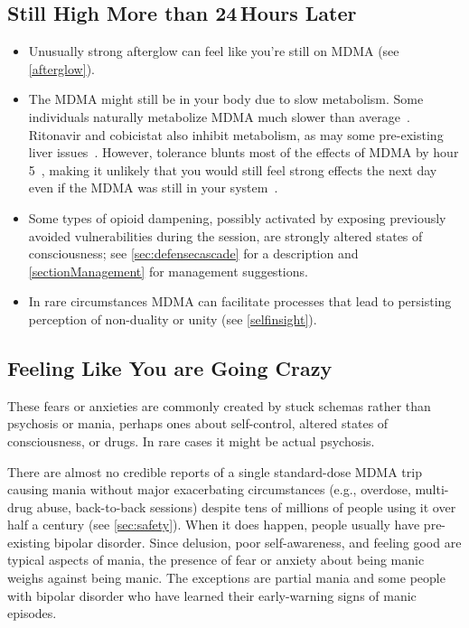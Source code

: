 \documentclass[11pt,oneside]{book}
\let\cite\parencite
\begin{document}
\subsection{Still High More than 24\,Hours Later}
\begin{itemize}
    \item Unusually strong afterglow can feel like you're still on MDMA (see \cref{afterglow}).
    \item The MDMA might still be in your body due to slow metabolism. Some individuals naturally metabolize MDMA much slower than average~\cite{straumann2024racemic}. Ritonavir and cobicistat also inhibit metabolism, as may some pre-existing liver issues~\cite{sarparastDrugInteractions,bracchi2015antiretrovirals}. However, tolerance blunts most of the effects of MDMA by hour 5~\cite{straumann2024racemic}, making it unlikely that you would still feel strong effects the next day even if the MDMA was still in your system~\cite{farreTolerance,parrottTolerance}.
    \item Some types of opioid dampening, possibly activated by exposing previously avoided vulnerabilities during the session, are strongly altered states of consciousness; see \cref{sec:defensecascade} for a description and \cref{sectionManagement} for management suggestions.
    \item In rare circumstances MDMA can facilitate processes that lead to persisting perception of non-duality or unity (see \cref{selfinsight}).
\end{itemize}

\subsection{Feeling Like You are Going Crazy}
\label{crazy}
These fears or anxieties are commonly created by stuck schemas rather than psychosis or mania, perhaps ones about self-control, altered states of consciousness, or drugs. In rare cases it might be actual psychosis.

There are almost no credible reports of a single standard-dose MDMA trip causing mania without major exacerbating circumstances (e.g., overdose, multi-drug abuse, back-to-back sessions) despite tens of millions of people using it over half a century (see \cref{sec:safety}). When it does happen, people usually have pre-existing bipolar disorder. Since delusion, poor self-awareness, and feeling good are typical aspects of mania, the presence of fear or anxiety about being manic weighs against being manic. The exceptions are partial mania and some people with bipolar disorder who have learned their early-warning signs of manic episodes.
\end{document}
